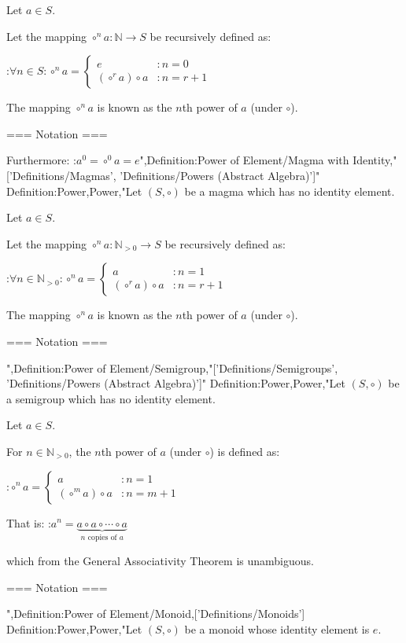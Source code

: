 Let $a \in S$.


Let the mapping $\circ^n a: \mathbb N \to S$ be recursively defined as:

:$\forall n \in S: \circ^n a = \begin{cases}
e & : n = 0 \\
\left( \circ^r a \right) \circ a & : n = r + 1
\end{cases}$


The mapping $\circ^n a$ is known as the $n$th power of $a$ (under $\circ$).


=== Notation ===


Furthermore:
:$a^0 = \circ^0 a = e$",Definition:Power of Element/Magma with Identity,"['Definitions/Magmas', 'Definitions/Powers (Abstract Algebra)']"
Definition:Power,Power,"Let $\left( S, \circ \right)$ be a magma which has no identity element.

Let $a \in S$.


Let the mapping $\circ^n a: \mathbb N_{>0} \to S$ be recursively defined as:

:$\forall n \in \mathbb N_{>0}: \circ^n a = \begin{cases}
a & : n = 1 \\
\left( \circ^r a \right) \circ a & : n = r + 1
\end{cases}$


The mapping $\circ^n a$ is known as the $n$th power of $a$ (under $\circ$).


=== Notation ===

",Definition:Power of Element/Semigroup,"['Definitions/Semigroups', 'Definitions/Powers (Abstract Algebra)']"
Definition:Power,Power,"Let $\left( S, \circ \right)$ be a semigroup which has no identity element.

Let $a \in S$.


For $n \in \mathbb N_{>0}$, the $n$th power of $a$ (under $\circ$) is defined as:

:$\circ^n a = \begin{cases} a & : n = 1 \\ \left( \circ^m a \right) \circ a & : n = m + 1 \end{cases}$

That is:
:$a^n = \underbrace {a \circ a \circ \cdots \circ a}_{n \text{ copies of } a}$

which from the General Associativity Theorem is unambiguous.


=== Notation ===

",Definition:Power of Element/Monoid,['Definitions/Monoids']
Definition:Power,Power,"Let $\left( S, \circ \right)$ be a monoid whose identity element is $e$.

